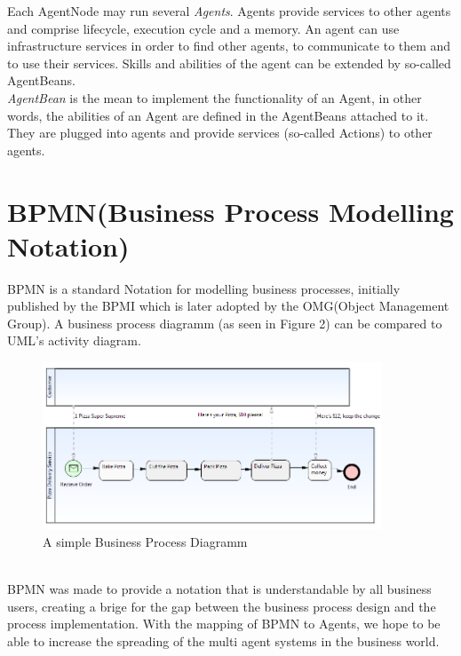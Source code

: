 Each AgentNode may run several \textit{Agents}. Agents provide services to other agents
and comprise lifecycle, execution cycle and a memory. An agent can use infrastructure
services in order to find other agents, to communicate to them and to use their services.
Skills and abilities of the agent can be extended by so-called AgentBeans.\\
\textit{AgentBean} is the mean to implement the functionality of an Agent, in other words, the abilities of an Agent are defined in the AgentBeans attached to it. They are plugged into agents and provide services (so-called Actions) to other agents. 

\section{BPMN(Business Process Modelling Notation)}
BPMN \cite{BPMN2} is a standard Notation for modelling business processes, initially published by the BPMI which is later adopted by the OMG(Object Management Group). A business process diagramm (as seen in Figure 2) can be compared to UML's activity diagram.
\begin{figure}[h]
	\centering
		\includegraphics[width=0.90\textwidth]{images/bpmn_sampl.png}
	\caption{A simple Business Process Diagramm}
	\label{fig:bpmn_sampl}
\end{figure}\\
BPMN was made to provide a notation that is understandable by all business users, creating a brige for the gap between the business process design and the process implementation. With the mapping of BPMN to Agents, we hope to be able to increase the spreading of the multi agent systems in the business world.

